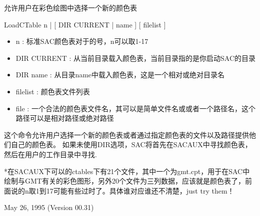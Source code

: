 \label{cmd:loadctable}

允许用户在彩色绘图中选择一个新的颜色表

LoadCTable n | [ DIR CURRENT | name ] [ filelist ]

\begin{itemize}
\item n : 标准SAC颜色表对于的号，n可以取1-17
\item DIR CURRENT : 从当前目录载入颜色表，当前目录指的是你启动SAC的目录
\item DIR name : 从目录name中载入颜色表，这是一个相对或绝对目录名 
\item filelist : 颜色表文件列表 
\item file : 一个合法的颜色表文件名，其可以是简单文件名或或者一个路径名，这个路径可以是相对路径或绝对路径 
\end{itemize}

这个命令允许用户选择一个新的颜色表或者通过指定颜色表的文件以及路径提供他们自己的颜色表。
如果未使用DIR选项，SAC将首先在SACAUX中寻找颜色表，然后在用户的工作目录中寻找.

*在SACAUX下可以的ctables下有21个文件，其中一个为gmt.cpt，用于在SAC中绘制与GMT有关的彩色图形，另外20个文件为三列数据，应该就是颜色表了，前面说的n取1到17可能有些过时了。具体谁对应谁还不清楚，just try them！

May 26, 1995 (Version 00.31)

